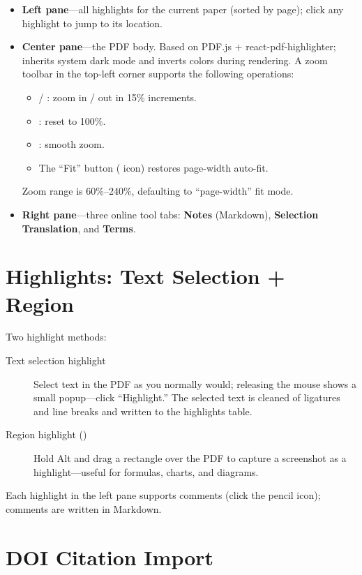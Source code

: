 \begin{itemize}
  \item \textbf{Left pane}---all highlights for the current paper (sorted by page);
    click any highlight to jump to its location.
  \item \textbf{Center pane}---the PDF body. Based on PDF.js + react-pdf-highlighter;
    inherits system dark mode and inverts colors during rendering. A zoom toolbar in
    the top-left corner supports the following operations:
    \begin{itemize}
      \item {} / : zoom in / out in 15\% increments.
      \item {}: reset to 100\%.
      \item {}: smooth zoom.
      \item The ``Fit'' button ( icon) restores page-width auto-fit.
    \end{itemize}
    Zoom range is 60\%--240\%, defaulting to ``page-width'' fit mode.
  \item \textbf{Right pane}---three online tool tabs: \textbf{Notes} (Markdown),
    \textbf{Selection Translation}, and \textbf{Terms}.
\end{itemize}

\section{Highlights: Text Selection + Region}

Two highlight methods:

\begin{description}
  \item[Text selection highlight] Select text in the PDF as you normally would;
    releasing the mouse shows a small popup---click ``Highlight.'' The selected text
    is cleaned of ligatures and line breaks and written to the highlights table.
  \item[Region highlight ()] Hold Alt and drag a rectangle over the PDF
    to capture a screenshot as a highlight---useful for formulas, charts, and diagrams.
\end{description}

Each highlight in the left pane supports comments (click the pencil icon); comments
are written in Markdown.

\section{DOI Citation Import}

